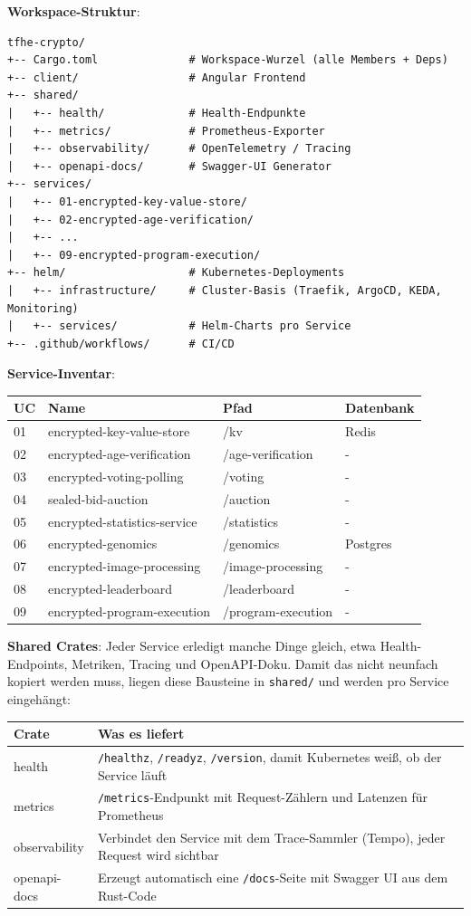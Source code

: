 \textbf{Workspace-Struktur}:

\begin{verbatim}
tfhe-crypto/
+-- Cargo.toml              # Workspace-Wurzel (alle Members + Deps)
+-- client/                 # Angular Frontend
+-- shared/
|   +-- health/             # Health-Endpunkte
|   +-- metrics/            # Prometheus-Exporter
|   +-- observability/      # OpenTelemetry / Tracing
|   +-- openapi-docs/       # Swagger-UI Generator
+-- services/
|   +-- 01-encrypted-key-value-store/
|   +-- 02-encrypted-age-verification/
|   +-- ...
|   +-- 09-encrypted-program-execution/
+-- helm/                   # Kubernetes-Deployments
|   +-- infrastructure/     # Cluster-Basis (Traefik, ArgoCD, KEDA, Monitoring)
|   +-- services/           # Helm-Charts pro Service
+-- .github/workflows/      # CI/CD
\end{verbatim}

\textbf{Service-Inventar}:

\begin{tabular}{||l|l|l|l||}
    \hline
    \textbf{UC} & \textbf{Name} & \textbf{Pfad} & \textbf{Datenbank} \\
    \hline\hline
    01 & encrypted-key-value-store & /kv & Redis \\
    02 & encrypted-age-verification & /age-verification & - \\
    03 & encrypted-voting-polling & /voting & - \\
    04 & sealed-bid-auction & /auction & - \\
    05 & encrypted-statistics-service & /statistics & - \\
    06 & encrypted-genomics & /genomics & Postgres \\
    07 & encrypted-image-processing & /image-processing & - \\
    08 & encrypted-leaderboard & /leaderboard & - \\
    09 & encrypted-program-execution & /program-execution & - \\
    \hline
\end{tabular}

\textbf{Shared Crates}:
Jeder Service erledigt manche Dinge gleich, etwa Health-Endpoints, Metriken, Tracing und OpenAPI-Doku. Damit das nicht neunfach kopiert werden muss, liegen diese Bausteine in \verb|shared/| und werden pro Service eingehängt:

\begin{tabular}{||l|p{8cm}||}
    \hline
    \textbf{Crate} & \textbf{Was es liefert} \\
    \hline\hline
    health & \verb|/healthz|, \verb|/readyz|, \verb|/version|, damit Kubernetes weiß, ob der Service läuft \\
    \hline
    metrics & \verb|/metrics|-Endpunkt mit Request-Zählern und Latenzen für Prometheus \\
    \hline
    observability & Verbindet den Service mit dem Trace-Sammler (Tempo), jeder Request wird sichtbar \\
    \hline
    openapi-docs & Erzeugt automatisch eine \verb|/docs|-Seite mit Swagger UI aus dem Rust-Code \\
    \hline
\end{tabular}

